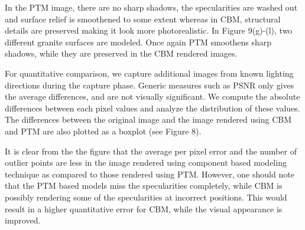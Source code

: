 In the PTM image, there are no sharp shadows, the specularities are washed out
and surface relief is smoothened to some extent whereas in CBM, structural
details are preserved making it look more photorealistic. In Figure 9(g)-(l),
two different granite surfaces are modeled. Once again PTM smoothens sharp
shadows, while they are preserved in the CBM rendered images.

For quantitative comparison, we capture additional images from known lighting
directions during the capture phase. Generic measures such as PSNR only gives
the average differences, and are not visually significant. We compute the
absolute differences between each pixel values and analyze the distribution of
these values. The differences between the original image and the image rendered
using CBM and PTM are also plotted as a boxplot (see Figure 8).




It is clear from the the figure that the average per pixel error and the number
of outlier points are less in the image rendered using component based modeling
technique as compared to those rendered using PTM. However, one should note that
the PTM based models miss the specularities completely, while CBM is possibly
rendering some of the specularities at incorrect positions. This would result in
a higher quantitative error for CBM, while the visual appearance is improved.

